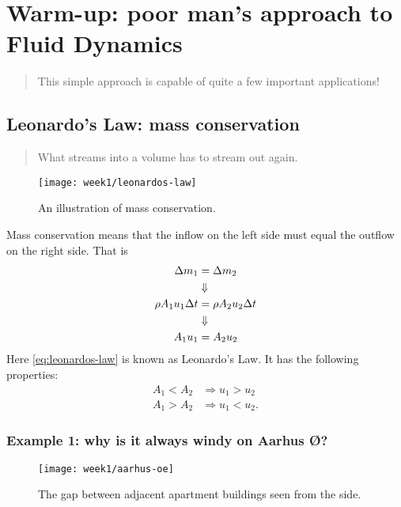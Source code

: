 \setcounter{page}{1}
\section{Warm-up: poor man's approach to Fluid Dynamics}
\begin{quote}
    This simple approach is capable of quite a few important applications!
\end{quote}

\subsection{Leonardo's Law: mass conservation}
\begin{quote}
    What streams into a volume has to stream out again.
\end{quote}

\begin{figure}[h!]
    \centering
    \texttt{[image: week1/leonardos-law]}
    \caption{An illustration of mass conservation.}
    \label{fig:leonardos-law}
\end{figure}

Mass conservation means that the inflow on the left side must equal the outflow on the right side. That is
\begin{align}
    \Delta m_1 &= \Delta m_2\\
    &\Downarrow\notag\\
    \rho A_1 u_1 \Delta t &= \rho A_2 u_2 \Delta t\\
    &\Downarrow\notag\\
    A_1 u_1 &= A_2 u_2 \label{eq:leonardos-law}
\end{align}
Here \eqref{eq:leonardos-law} is known as Leonardo's Law. It has the following properties:
\begin{align}
    A_1 < A_ 2 &\Rightarrow u_1 > u_2\\
    A_1 > A_ 2 &\Rightarrow u_1 < u_2.
    \label{}
\end{align}

\subsubsection{Example 1: why is it always windy on Aarhus Ø?}
\begin{figure}[!h]
    \centering
    \texttt{[image: week1/aarhus-oe]}
    \caption{The gap between adjacent apartment buildings seen from the side.}
    \label{fig:aarhus-oe}
\end{figure}

